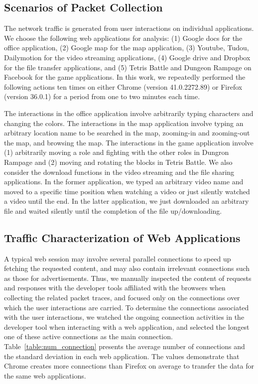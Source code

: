 \documentclass[preprint,12pt]{elsarticle}
\begin{document}
\subsection{Scenarios of Packet Collection}
\label{sec:scenario}
The network traffic is generated from user interactions on individual applications. We choose the following web applications for analysis: (1) Google docs for the office application, (2) Google map for the map application, (3) Youtube, Tudou, Dailymotion for the video streaming applications, (4) Google drive and Dropbox for the file transfer applications, and (5) Tetris Battle and Dungeon Rampage on Facebook for the game applications. In this work, we repeatedly performed the following actions ten times on either Chrome (version 41.0.2272.89) or Firefox (version 36.0.1) for a period from one to two minutes each time.

The interactions in the office application involve arbitrarily typing characters and changing the colors. The interactions in the map application involve typing an arbitrary location name to be searched in the map, zooming-in and zooming-out the map, and browsing the map. The interactions in the game application involve (1) arbitrarily moving a role and fighting with the other roles in Dungron Rampage and (2) moving and rotating the blocks in Tetris Battle. We also consider the download functions in the video streaming and the file sharing applications. In the former application, we typed an arbitrary video name and moved to a specific time position when watching a video or just silently watched a video until the end. In the latter application, we just downloaded an arbitrary file and waited silently until the completion of the file up/downloading.

\subsection{Traffic Characterization of Web Applications}
\label{sec:characterization}
A typical web session may involve several parallel connections to speed up fetching the requested content, and may also contain irrelevant connections such as those for advertisements. Thus, we manually inspected the content of requests and responses with the developer tools affiliated with the browsers when collecting the related packet traces, and focused only on the connections over which the user interactions are carried. To determine the connections associated with the user interactions, we watched the ongoing connection activities in the developer tool when interacting with a web application, and selected the longest one of these active connections as the main connection. Table~\ref{table:num_connection} presents the average number of connections and the standard deviation in each web application. The values demonstrate that Chrome creates more connections than Firefox on average to transfer the data for the same web applications. 
\end{document}
